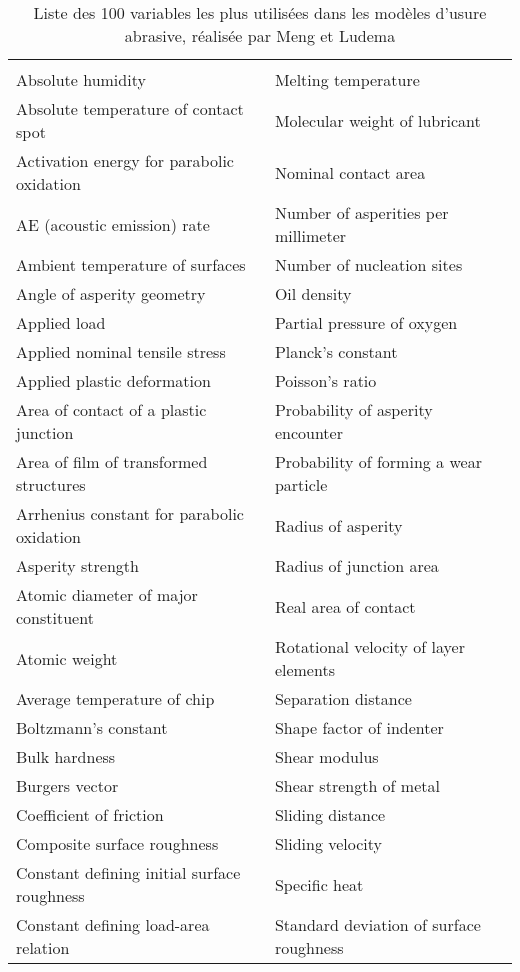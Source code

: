 \begin{scriptsize}
\begin{longtable}[b]{ll}\\
\caption{Liste des 100 variables les plus utilisées dans les modèles d’usure abrasive, réalisée par Meng et Ludema \cite{Meng1995}}
\label{ann:WMO-listVariablesLudema}\\
Absolute humidity 	&	Melting temperature 		\\
Absolute temperature of contact spot 	&	Molecular weight of lubricant 		\\
Activation energy for parabolic oxidation 	&	Nominal contact area 		\\
AE (acoustic emission) rate 	&	Number of asperities per millimeter 		\\
Ambient temperature of surfaces 	&	Number of nucleation sites 		\\
Angle of asperity geometry 	&	Oil density 		\\
Applied load	&	Partial pressure of oxygen 		\\
Applied nominal tensile stress 	&	Planck’s constant 		\\
Applied plastic deformation 	&	Poisson’s ratio 		\\
Area of contact of a plastic junction 	&	Probability of asperity encounter 		\\
Area of film of transformed structures 	&	Probability of forming a wear particle 		\\
Arrhenius constant for parabolic oxidation 	&	Radius of asperity 		\\
Asperity strength 	&	Radius of junction area 		\\
Atomic diameter of major constituent 	&	Real area of contact		\\
Atomic weight 	&	Rotational velocity of layer elements 		\\
Average temperature of chip 	&	Separation distance 		\\
Boltzmann’s constant 	&	Shape factor of indenter 		\\
Bulk hardness 	&	Shear modulus 		\\
Burgers vector 	&	Shear strength of metal 		\\
Coefficient of friction 	&	Sliding distance 		\\
Composite surface roughness 	&	Sliding velocity 		\\
Constant defining initial surface roughness 	&	Specific heat 		\\
Constant defining load-area relation 	&	Standard deviation of surface roughness 		\\

\end{longtable}
\end{scriptsize}
